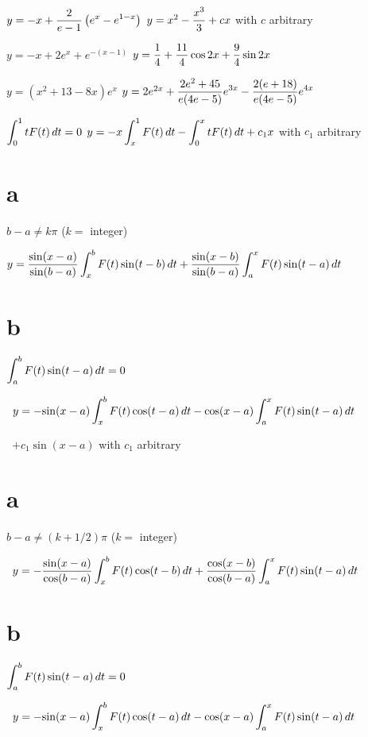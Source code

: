 \medskip

 $y=-x+\displaystyle{\frac{2}{e-1}\left(e^{x}-e^{1-x}\right)}$\;
 $y=x^{2}-\displaystyle{\frac{x^{3}}{3}}+cx$ with $c$ arbitrary

$y=-x+2e^{x}+e^{-(x-1)}$\;
 $y=\displaystyle{\frac{1}{4}+\frac{11}{4}\cos2x+\frac{9}{4}\sin2x}$

\smallskip
{}  $y=(x^{2}+13-8x)e^{x}$\;
  $y=2e^{2x}+\displaystyle{\frac{2e^{2}+45}{e(4e-5)}e^{3x}-\frac{2(e+18)}{e(4e-5)}e^{4x}}$

 $\displaystyle{\int_{0}^{1}tF(t)\,dt=0}$\;
$y=\displaystyle{-x\int_{x}^{1}F(t)\,dt-\int_{0}^{x}tF(t)\,dt+c_{1}x}$ with $c_{1}$
arbitrary

\smallskip
{} \part{a}\;   $b-a\ne k\pi$\;    ($k=$ integer)

\smallskip
\qquad\; \;  $y=\displaystyle{\frac{\sin(x-a)}{\sin(b-a)}\int_{x}^{b}F(t)\sin(t-b)\,dt
+\frac{\sin(x-b)}{\sin(b-a)}\int_{a}^{x}F(t)\sin(t-a)\,dt}$
\smallskip

\quad\;  \;  \part{b}\;    $\displaystyle{\int_{a}^{b}F(t)\sin(t-a)\,dt=0}$

\qquad\; \;  \,
$y=-\displaystyle{\sin(x-a)\int_{x}^{b}F(t)\cos(t-a)\,dt
-\cos(x-a)\int_{a}^{x}F(t)\sin(t-a)\,dt}$

\smallskip
\qquad\; \;  \,
$+c_{1}\sin(x-a)$ with  $c_{1}$ arbitrary

 \part{a}\;    $b-a\ne(k+1/2)\pi$\;    ($k=$ integer)

\qquad\; \;  \,
$y=-\displaystyle{\frac{\sin(x-a)}{\cos(b-a)}\int_{x}^{b}F(t)\cos(t-b)\,dt+
 \frac{\cos(x-b)}{\cos(b-a)}\int_{a}^{x}F(t)\sin(t-a)\,dt}$

\quad\;  \;  \part{b}\;    $\displaystyle{\int_{a}^{b}F(t)\sin(t-a)\,dt=0}$

\qquad\; \;  \,
$y=-\displaystyle{\sin(x-a)\int_{x}^{b}F(t)\cos(t-a)\,dt
-\cos(x-a)\int_{a}^{x}F(t)\sin(t-a)\,dt}$

